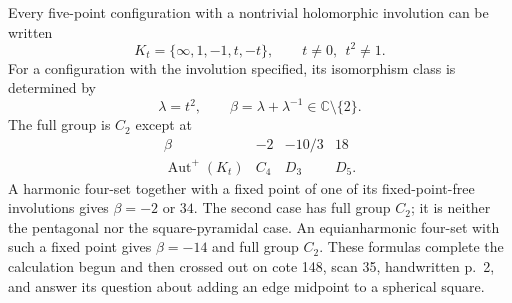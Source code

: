 Every five-point configuration with a nontrivial holomorphic
involution can be written
\[
 K_t=\{\infty,1,-1,t,-t\},\qquad t\ne0,\ \ t^2\ne1.
\]
For a configuration with the involution specified, its isomorphism
class is determined by
\[
 \lambda=t^2,\qquad\beta=\lambda+\lambda^{-1}\in\mathbb C\setminus\{2\}.
\]
The full group is $C_2$ except at
\[
 \begin{array}{c|ccc}
 \beta&-2&-10/3&18\\\hline
 \operatorname{Aut}^+(K_t)&C_4&D_3&D_5.
 \end{array}
\]
A harmonic four-set together with a fixed point of one of its
fixed-point-free involutions gives $\beta=-2$ or $34$.
The second case has full group $C_2$; it is neither the pentagonal
nor the square-pyramidal case.  An equianharmonic four-set with
such a fixed point gives $\beta=-14$ and full group $C_2$.
These formulas complete the calculation begun and then crossed out
on cote 148, scan 35, handwritten p.~2, and answer its question
about adding an edge midpoint to a spherical square.
